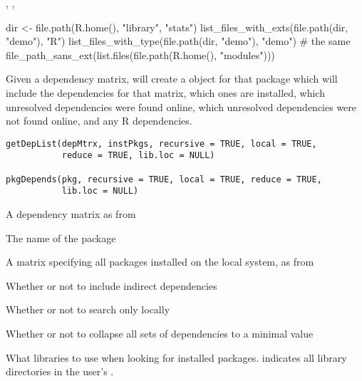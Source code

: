 %
\begin{SeeAlso}\relax
{},
,
\end{SeeAlso}
%
\begin{Examples}
\begin{ExampleCode}
dir <- file.path(R.home(), "library", "stats")
list_files_with_exts(file.path(dir, "demo"), "R")
list_files_with_type(file.path(dir, "demo"), "demo") # the same
file_path_sans_ext(list.files(file.path(R.home(), "modules")))
\end{ExampleCode}
\end{Examples}
%
\begin{Description}\relax
Given a dependency matrix, will create a  object for that
package which will include the dependencies for that matrix, which
ones are installed, which unresolved dependencies were found online,
which unresolved dependencies were not found online, and any R dependencies.
\end{Description}
%
\begin{Usage}
\begin{verbatim}
getDepList(depMtrx, instPkgs, recursive = TRUE, local = TRUE,
           reduce = TRUE, lib.loc = NULL)

pkgDepends(pkg, recursive = TRUE, local = TRUE, reduce = TRUE,
           lib.loc = NULL)
\end{verbatim}
\end{Usage}
%
\begin{Arguments}
\begin{ldescription}
\item[\code{depMtrx}] A dependency matrix as from 
\item[\code{pkg}] The name of the package
\item[\code{instPkgs}] A matrix specifying all packages installed on the
local system, as from 
\item[\code{recursive}] Whether or not to include indirect dependencies
\item[\code{local}] Whether or not to search only locally
\item[\code{reduce}] Whether or not to collapse all sets of dependencies to a
minimal value
\item[\code{lib.loc}] What libraries to use when looking for installed
packages.   indicates all library directories in the
user's .
\end{ldescription}
\end{Arguments}
